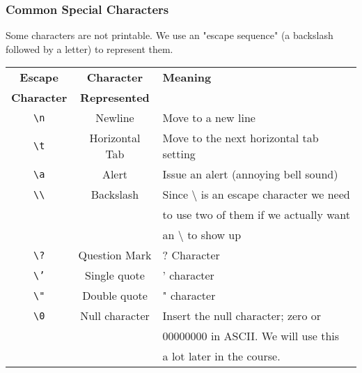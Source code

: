 \documentclass{beamer}
\begin{document}
\begin{frame}
\frametitle{Common Special Characters}
Some characters are not printable. We use an "escape sequence" (a backslash followed by a letter) to represent them.\pause
\begin{center}
\scriptsize
\begin{tabular}{|c|c|l|}
\hline
\textbf{Escape} & \textbf{Character} & \textbf{Meaning} \\
\textbf{Character} & \textbf{Represented} & \\
\hline
\texttt{\textbackslash n} & Newline & Move to a new line \\
\texttt{\textbackslash t} & Horizontal Tab & Move to the next horizontal tab setting \\
\texttt{\textbackslash a} & Alert & Issue an alert (annoying bell sound) \\
\texttt{\textbackslash\textbackslash} & Backslash & Since \textbackslash{} is an escape character we need \\
& & to use two of them if we actually want \\
& & an \textbackslash{} to show up \\
\texttt{\textbackslash?} & Question Mark & ? Character \\
\texttt{\textbackslash'} & Single quote & ' character \\
\texttt{\textbackslash"} & Double quote & " character \\
\texttt{\textbackslash 0} & Null character & Insert the null character; zero or \\
& & 00000000 in ASCII. We will use this \\
& & a lot later in the course. \\
\hline
\end{tabular}
\end{center}
\end{frame}
\end{document}
